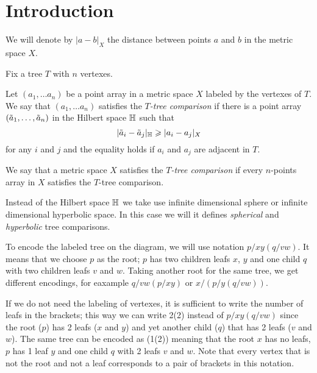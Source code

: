 \section{Introduction}\label{sec:intro}

We will denote by $|a-b|_X$ the distance between points $a$ and $b$ in the metric space $X$.

Fix a tree $T$ with $n$ vertexes.

Let $(a_1,\dots a_n)$ be a point array in a metric space $X$ labeled by the vertexes of $T$.
We say that $(a_1,\dots a_n)$  satisfies the \emph{$T$-tree comparison} if there is a point array $(\~a_1,\dots, \~a_n)$ in the Hilbert space $\HH$ such that 
\[|\~a_i-\~a_j|_\HH\ge|a_i-a_j|_X\]
for any $i$ and $j$ and the equality holds if $a_i$ and $a_j$ are adjacent in $T$.

We say that a metric space $X$ satisfies the \emph{$T$-tree comparison} if 
every $n$-points array in $X$ satisfies the $T$-tree comparison.

Instead of the Hilbert space $\HH$ we take use infinite dimensional sphere or infinite dimensional hyperbolic space.
In this case we will it defines \emph{spherical} and \emph{hyperbolic} tree comparisons.

\begin{wrapfigure}{r}{27 mm}
\vskip-8mm
\end{wrapfigure}

To encode the labeled tree on the diagram, we will use notation $p/xy(q/vw)$.
It means that we choose $p$ as the root; 
$p$ has two children leafs $x$, $y$ and one child $q$ with two children leafs $v$ and $w$.
Taking another root for the same tree, we get different encodings, for eaxample $q/vw(p/xy)$ or $x/(p/y(q/vw))$.

If we do not need the labeling of vertexes,
it is sufficient to write the number of leafs in the brackets;
this way we can write 2(2) instead of $p/xy(q/vw)$ since the root ($p$) has 2 leafs ($x$ and $y$) and yet another child ($q$) that has 2 leafs ($v$ and $w$).  
The same tree can be encoded as (1(2)) meaning that the root $x$ has no leafs, 
$p$ has 1 leaf $y$ and one child $q$ with 2 leafs $v$ and $w$.
Note that every vertex that is not the root and not a leaf corresponds to a pair of brackets in this notation.

